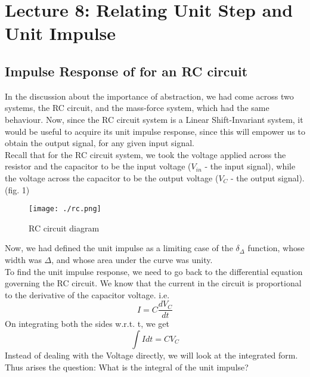 \section{Lecture 8: Relating Unit Step and Unit Impulse}


\subsection{Impulse Response of for an RC circuit}
In the discussion about the importance of abstraction, we had come across two systems, the RC circuit, and the mass-force system, which had the same behaviour. Now, since the RC circuit system is a Linear Shift-Invariant system, it would be useful to acquire its unit impulse response, since this will empower us to obtain the output signal, for any given input signal.\\
\indent Recall that for the RC circuit system, we took the voltage applied across the resistor and the capacitor to be the input voltage ($V_{in}$ - the input signal), while the voltage across the capacitor to be the output voltage ($V_C$ - the output signal). (fig. 1)
\begin{figure}[H]
	\centering
	\texttt{[image: ./rc.png]}
	\caption{RC circuit diagram}
\end{figure}
\indent Now, we had defined the unit impulse as a limiting case of the $\delta_\Delta$ function, whose width was $\Delta$, and whose area under the curve was unity.\\
\indent To find the unit impulse response, we need to go back to the differential equation governing the RC circuit. We know that the current in the circuit is proportional to the derivative of the capacitor voltage. i.e.
$$I=C\frac{dV_C}{dt}$$
\indent On integrating both the sides w.r.t. t, we get 
$$\int I dt = CV_C$$
\indent Instead of dealing with the Voltage directly, we will look at the integrated form. Thus arises the question: What is the integral of the unit impulse?
